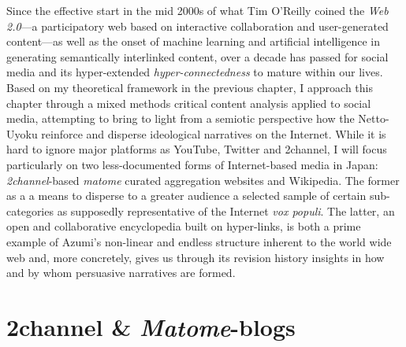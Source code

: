 \documentclass[10pt,british,A4paper,,openany]{memoir}
\begin{document}
Since the effective start in the mid 2000s of what Tim O'Reilly coined
the \emph{Web 2.0}---a participatory web based on interactive
collaboration and user-generated content---as well as the onset of
machine learning and artificial intelligence in generating semantically
interlinked content, over a decade has passed for social media and its
hyper-extended \emph{hyper-connectedness} to mature within our lives.
Based on my theoretical framework in the previous chapter, I approach
this chapter through a mixed methods critical content analysis applied
to social media, attempting to bring to light from a semiotic
perspective how the Netto-Uyoku reinforce and disperse ideological
narratives on the Internet. While it is hard to ignore major platforms
as YouTube, Twitter and 2channel, I will focus particularly on two
less-documented forms of Internet-based media in Japan:
\emph{2channel}-based \emph{matome} curated aggregation websites and
Wikipedia. The former as a a means to disperse to a greater audience a
selected sample of certain sub-categories as supposedly representative
of the Internet \emph{vox populi}. The latter, an open and collaborative
encyclopedia built on hyper-links, is both a prime example of Azumi's
non-linear and endless structure inherent to the world wide web and,
more concretely, gives us through its revision history insights in how
and by whom persuasive narratives are formed.

\section{\texorpdfstring{2channel \&
\emph{Matome}-blogs}{2channel \& Matome-blogs}}\label{channel-matome-blogs}
\end{document}
